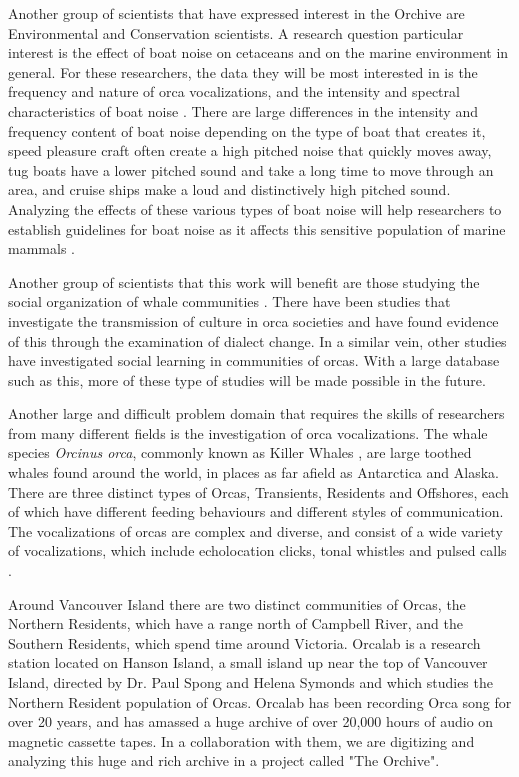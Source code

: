 Another group of scientists that have expressed interest in the
Orchive are Environmental and Conservation scientists. A research
question particular interest is the effect of boat noise
\cite{foote04_orca_boat_noise} on cetaceans and on the marine
environment in general.  For these researchers, the data they will be
most interested in is the frequency and nature of orca vocalizations,
and the intensity and spectral characteristics of boat noise
\cite{holt09_orca_speaking_up}.  There are large differences in the
intensity and frequency content of boat noise depending on the type of
boat that creates it, speed pleasure craft often create a high pitched
noise that quickly moves away, tug boats have a lower pitched sound
and take a long time to move through an area, and cruise ships make a
loud and distinctively high pitched sound.  Analyzing the effects of
these various types of boat noise will help researchers to establish
guidelines for boat noise as it affects this sensitive population of
marine mammals \cite{doksaeter09_orca_herring_feeding}.

Another group of scientists that this work will benefit are those
studying the social organization of whale communities
\cite{bigg90_orca_genealogy}.  There have been studies that
investigate the transmission of culture in orca societies
\cite{deecke00} and have found evidence of this through the
examination of dialect change.  In a similar vein, other studies have
investigated social learning \cite{janik00_orca_social_communication}
in communities of orcas.  With a large database such as this, more of
these type of studies will be made possible in the future.

Another large and difficult problem domain that requires the skills of
researchers from many different fields is the investigation of orca
vocalizations.  The whale species \emph{Orcinus orca}, commonly known
as Killer Whales \cite{ford00_book_killer_whales}, are large toothed
whales found around the world, in places as far afield as Antarctica
and Alaska\cite{estes09_orca_alaska_decline}.  There are three
distinct types of Orcas, Transients, Residents and Offshores, each of
which have different feeding behaviours and different styles of
communication.  The vocalizations of orcas are complex and diverse,
and consist of a wide variety of vocalizations, which include
echolocation clicks, tonal whistles and pulsed calls \cite{deecke00}.

Around Vancouver Island there are two distinct communities of Orcas,
the Northern Residents, which have a range north of Campbell River,
and the Southern Residents, which spend time around Victoria.  Orcalab
is a research station located on Hanson Island, a small island up near
the top of Vancouver Island, directed by Dr. Paul Spong and Helena
Symonds and which studies the Northern Resident population of Orcas.
Orcalab has been recording Orca song for over 20 years, and has
amassed a huge archive of over 20,000 hours of audio on magnetic
cassette tapes.  In a collaboration with them, we are digitizing and
analyzing this huge and rich archive in a project called "The
Orchive".

